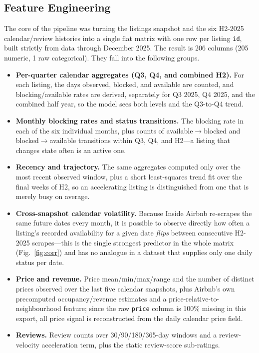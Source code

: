 \documentclass[journal]{IEEEtran}
\begin{document}
\subsection{Feature Engineering}
\label{sec:featuregroups}
The core of the pipeline was turning the listings snapshot and the six H2-2025
calendar/review histories into a single flat matrix with one row per listing
\texttt{id}, built strictly from data through December 2025. The result is 206
columns (205 numeric, 1 raw categorical). They fall into the following groups.
\begin{itemize}
\item \textbf{Per-quarter calendar aggregates (Q3, Q4, and combined H2).} For
each listing, the days observed, blocked, and available are counted, and
blocking/available rates are derived, separately for Q3 2025, Q4 2025, and the
combined half year, so the model sees both levels and the Q3-to-Q4 trend.
\item \textbf{Monthly blocking rates and status transitions.} The blocking
rate in each of the six individual months, plus counts of
available$\to$blocked and blocked$\to$available transitions within Q3, Q4, and
H2---a listing that changes state often is an active one.
\item \textbf{Recency and trajectory.} The same aggregates computed only over
the most recent observed window, plus a short least-squares trend fit over the
final weeks of H2, so an accelerating listing is distinguished from one that is
merely busy on average.
\item \textbf{Cross-snapshot calendar volatility.} Because Inside Airbnb
re-scrapes the same future dates every month, it is possible to observe
directly how often a listing's recorded availability for a given date
\emph{flips} between consecutive H2-2025 scrapes---this is the single strongest
predictor in the whole matrix (Fig.~\ref{fig:corr}) and has no analogue in a
dataset that supplies only one daily status per date.
\item \textbf{Price and revenue.} Price mean/min/max/range and the number of
distinct prices observed over the last five calendar snapshots, plus Airbnb's
own precomputed occupancy/revenue estimates and a price-relative-to-neighbourhood
feature; since the raw \texttt{price} column is 100\% missing in this export,
all price signal is reconstructed from the daily calendar price field.
\item \textbf{Reviews.} Review counts over 30/90/180/365-day windows and a
review-velocity acceleration term, plus the static review-score sub-ratings.

\end{itemize}
\end{document}
